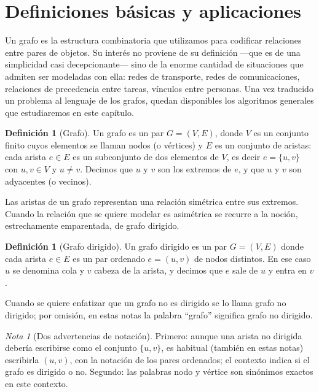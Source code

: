 \documentclass[12pt, spanish, oneside, openany]{book}
\theoremstyle{uprightplain}
\theoremstyle{definition}
\newtheorem{definicion}[teorema]{Definición}
\theoremstyle{remark}
\newtheorem{nota}[teorema]{Nota}
\theoremstyle{definition}
\begin{document}
\section{Definiciones básicas y aplicaciones}

Un grafo es la estructura combinatoria que utilizamos para codificar relaciones entre pares de objetos. Su interés no proviene de su definición ---que es de una simplicidad casi decepcionante--- sino de la enorme cantidad de situaciones que admiten ser modeladas con ella: redes de transporte, redes de comunicaciones, relaciones de precedencia entre tareas, vínculos entre personas. Una vez traducido un problema al lenguaje de los grafos, quedan disponibles los algoritmos generales que estudiaremos en este capítulo.

\begin{definicion}[Grafo]
\label{def:grafo}
Un grafo es un par $G=(V,E)$, donde $V$ es un conjunto finito cuyos elementos se llaman nodos (o vértices) y $E$ es un conjunto de aristas: cada arista $e\in E$ es un subconjunto de dos elementos de $V$, es decir $e=\{u,v\}$ con $u,v\in V$ y $u\neq v$. Decimos que $u$ y $v$ son los extremos de $e$, y que $u$ y $v$ son adyacentes (o vecinos).
\end{definicion}

Las aristas de un grafo representan una relación simétrica entre sus extremos. Cuando la relación que se quiere modelar es asimétrica se recurre a la noción, estrechamente emparentada, de grafo dirigido.

\begin{definicion}[Grafo dirigido]
\label{def:grafo-dirigido}
Un grafo dirigido es un par $G=(V,E)$ donde cada arista $e\in E$ es un par ordenado $e=(u,v)$ de nodos distintos. En ese caso $u$ se denomina cola y $v$ cabeza de la arista, y decimos que $e$ sale de $u$ y entra en $v$.
\end{definicion}

Cuando se quiere enfatizar que un grafo no es dirigido se lo llama grafo no dirigido; por omisión, en estas notas la palabra ``grafo'' significa grafo no dirigido.

\begin{nota}[Dos advertencias de notación]
Primero: aunque una arista no dirigida debería escribirse como el conjunto $\{u,v\}$, es habitual (también en estas notas) escribirla $(u,v)$, con la notación de los pares ordenados; el contexto indica si el grafo es dirigido o no. Segundo: las palabras nodo y vértice son sinónimos exactos en este contexto.
\end{nota}
\end{document}
